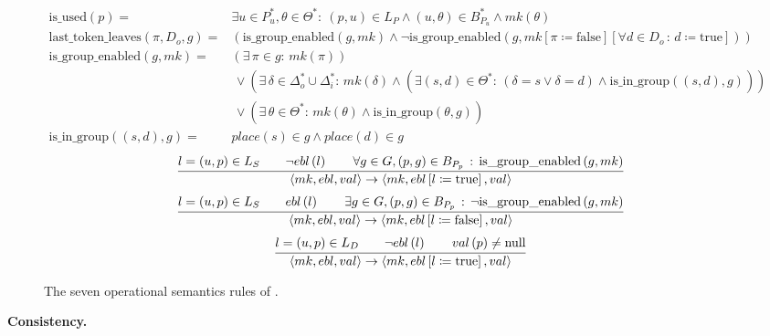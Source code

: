 {\begin{figure}[tp]
\begin{align*}
\text{is\_used}\left(p\right) = & \exists u\in P_{u}^{*},\theta\in\Theta^{*}:~\left(p,u\right)\in L_{P}\land \left(u,\theta\right)\in B_{P_u}^{*}\land mk\left(\theta\right) \\
\text{last\_token\_leaves}\left(\pi,D_o,g\right) = & \left(\text{is\_group\_enabled}\left(g,mk\right)\land\lnot \text{is\_group\_enabled} \left(g,mk\left[\pi\coloneqq \text{false}\right]\left[\forall d\in D_o \,:\,d\coloneqq \text{true}\right]\right)\right) \\
\text{is\_group\_enabled}\left(g,mk\right) = & \left(\exists\,\pi\in g:\,mk\left(\pi\right)\right)\\
 & \, \lor\left(\exists\,\delta\in\Delta_{o}^{*}\cup\Delta_{i}^{*}:\,mk\left(\delta\right)\land \left(\exists(s,d)\in\Theta^{*}:\,\left(\delta=s\lor \delta=d\right)\land \text{is\_in\_group}\left((s,d),g\right)\right)\right)\\
 & \, \lor\left(\exists\,\theta\in\Theta^{*}:\,mk\left(\theta\right)\land \text{is\_in\_group}\left(\theta,g\right)\right) \\
\text{is\_in\_group}\left((s,d),g\right) = & place\left(s\right)\in g\land place\left(d\right)\in g
\end{align*}
%
\begin{equation}
\cfrac{l = (u,p)\in L_{S}\qquad\lnot ebl\left(l\right)\qquad\forall g \in G,\left(p,g\right)\in B_{P_{p}}\,:\,\text{is\_group\_enabled}\left(g,mk\right)}{\left\langle mk,ebl,val\right\rangle \rightarrow\left\langle mk,ebl\left[l\coloneqq\text{true}\right],val\right\rangle }
\label{eq:r5}
\end{equation}
%
\begin{equation}
\cfrac{l=(u,p)\in L_{S}\qquad ebl\left(l\right)\qquad\exists g \in G,\left(p,g\right)\in B_{P_{p}}\,:\,\lnot\text{is\_group\_enabled}\left(g,mk\right)}{\left\langle mk,ebl,val\right\rangle \rightarrow\left\langle mk,ebl\left[l\coloneqq\text{false}\right],val\right\rangle }
\label{eq:r6}
\end{equation}
%
\begin{equation}
\cfrac{l=(u,p)\in L_{D}\qquad\lnot ebl\left(l\right)\qquad val\left(p\right)\neq\text{null}}{\left\langle mk,ebl,val\right\rangle \rightarrow\left\langle mk,ebl\left[l\coloneqq\text{true}\right],val\right\rangle }
\label{eq:r7}
\end{equation}
%
\caption{The seven operational semantics rules of \mad.}
\label{fig:rules}
\end{figure}

\textbf{Consistency.}

}

